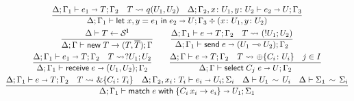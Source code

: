 \begin{figure}[h!]
\begin{gather*}
    \frac{
      \algtypeout[\kindEnv ; \varEnv_1]{e_1}{T}{\varEnv_2}
      \quad
      T \Extract{} q(U_1, U_2)
      \quad
      \algtypeout[\kindEnv; \varEnv_2, x\colon U_1, y\colon U_2]{e_2}{U}{\varEnv_3}
    }{
      \algtypeout[\kindEnv;
      \varEnv_1]{\binlete{x}{y}{e_1}{e_2}}{U}{\varEnv_3} \div (x\colon U_1, y\colon U_2)
    }
    \\
    \frac{
      \kindEnv \Alg T \leftarrow \kinds^{\Lin}
    }{
      \kindEnv;\varEnv \Alg \newe{T} \rightarrow (T, \dual{T}); \varEnv
    }
    \qquad
    \frac{
      \algtypeout[\kindEnv;\varEnv_1]{e}{T}{\varEnv_2}
      \quad
      T\Extract{} (!U_1;U_2)
    }{
      \algtypeout[\kindEnv;\varEnv_1]{\sendce e}{(U_1\multimap U_2)}{\varEnv_2}
    }
    \\
    \frac{
      \algtypeout[\kindEnv;\varEnv_1]{e_1}{T}{\varEnv_2}
      \quad T
      \Extract{} ?U_1;U_2
    }{
      \algtypeout[\kindEnv;\varEnv_1]{\recve e}{(U_1,U_2)}{\varEnv_2}
    }
    \qquad
    \frac{
      \algtypeout[\kindEnv;\varEnv]{e}{T}{\varEnv_2}
      \quad
      T \Extract{}\oplus\{C_i\colon U_i\}
      \quad
      j \in I
    }{
      \algtypeout[\kindEnv;\varEnv]{\selecte{C_j}{e}}{U}{\varEnv_2}
    }
    \\
    \frac{
      \algtypeout[\kindEnv;\varEnv_1]{e}{T}{\varEnv_2}
      \quad
      T \Extract{} \&\{C_i\colon T_i\}
      \quad 
      \algtypeout[\kindEnv;\varEnv_2, x_i\colon T_i]{e_i}{U_i}{\Sigma_i}
      \quad 
      \typeequiv{U_1}{U_i}
      \quad
      \ctxequiv{\Sigma_1}{\Sigma_i} 
    }{
      \algtypeout[\kindEnv;\varEnv_1]{\matche{e}{\{C_i\,x_i \rightarrow e_i\}}}{U_1}{\Sigma_1}
    }

\end{gather*}
\end{figure}
